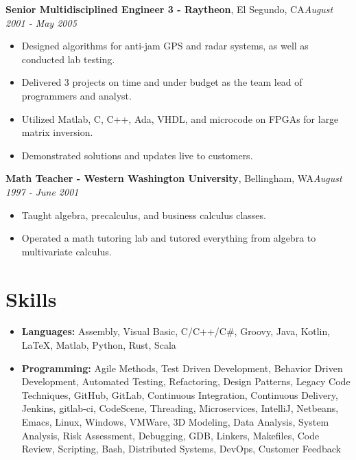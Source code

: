 \documentclass[letter,11pt]{article}
\begin{document}
\noindent
\textbf{Senior Multidisciplined Engineer 3 - Raytheon}, El Segundo, CA\hfill \textit{August 2001 - May 2005}
\begin{itemize}[leftmargin=*,itemsep=0pt, parsep=0pt,label=$\diamond$]
\item Designed algorithms for anti-jam GPS and radar systems, as well as conducted lab testing.
\item Delivered 3 projects on time and under budget as the team lead of programmers and analyst.
\item Utilized Matlab, C, C++, Ada, VHDL, and microcode on FPGAs for large matrix inversion.
\item Demonstrated solutions and updates live to customers.
\end{itemize}

\noindent
\textbf{Math Teacher - Western Washington University}, Bellingham, WA\hfill \textit{August 1997 - June 2001}
\begin{itemize}[leftmargin=*,itemsep=0pt, parsep=0pt,label=$\diamond$]
\item Taught algebra, precalculus, and business calculus classes.
\item Operated a math tutoring lab and tutored everything from algebra to multivariate calculus.
\end{itemize}

\pagebreak
\section*{Skills}
\begin{itemize}[leftmargin=*,itemsep=0pt, parsep=0pt,label=$\diamond$]
\item \textbf{Languages:} Assembly, Visual Basic, C/C++/C\#, Groovy, Java, Kotlin, LaTeX, Matlab, Python, Rust, Scala
\item \textbf{Programming:} Agile Methods, Test Driven Development, Behavior Driven Development, Automated Testing, Refactoring, Design Patterns, Legacy Code Techniques, GitHub, GitLab, Continuous Integration, Continuous Delivery, Jenkins, gitlab-ci, CodeScene, Threading, Microservices, IntelliJ, Netbeans, Emacs, Linux, Windows, VMWare, 3D Modeling, Data Analysis, System Analysis, Risk Assessment, Debugging, GDB, Linkers, Makefiles, Code Review, Scripting, Bash, Distributed Systems, DevOps, Customer Feedback
\end{itemize}


\end{document}
